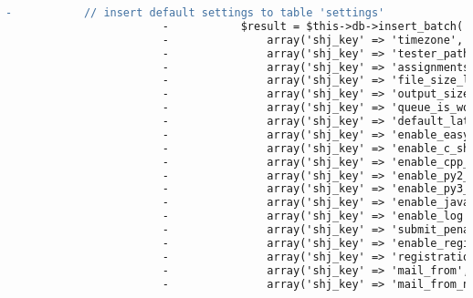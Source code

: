 \begin{lstlisting}[language=diff, caption=Perubahan pada kode Install.php]
						-			// insert default settings to table 'settings'
						-			$result = $this->db->insert_batch('settings', array(
						-				array('shj_key' => 'timezone',               'shj_value' => 'Asia/Jakarta'),
						-				array('shj_key' => 'tester_path',            'shj_value' => dirname(__FILE__, 3) . "/restricted/tester"),
						-				array('shj_key' => 'assignments_root',       'shj_value' => dirname(__FILE__, 3) . "/restricted/assignments"),
						-				array('shj_key' => 'file_size_limit',        'shj_value' => '50'),
						-				array('shj_key' => 'output_size_limit',      'shj_value' => '1024'),
						-				array('shj_key' => 'queue_is_working',       'shj_value' => '0'),
						-				array('shj_key' => 'default_late_rule',      'shj_value' => "/* \n * Put coefficient (from 100) in variable \$coefficient.\n * You can use variables \$extra_time and \$delay.\n * \$extra_time is the total extra time given to users\n * (in seconds) and \$delay is number of seconds passed\n * from finish time (can be negative).\n *  In this example, \$extra_time is 172800 (2 days):\n */\n\nif (\$delay<=0)\n  // no delay\n  \$coefficient = 100;\n\nelseif (\$delay<=3600)\n  // delay less than 1 hour\n  \$coefficient = ceil(100-((30*\$delay)/3600));\n\nelseif (\$delay<=86400)\n  // delay more than 1 hour and less than 1 day\n  \$coefficient = 70;\n\nelseif ((\$delay-86400)<=3600)\n  // delay less than 1 hour in second day\n  \$coefficient = ceil(70-((20*(\$delay-86400))/3600));\n\nelseif ((\$delay-86400)<=86400)\n  // delay more than 1 hour in second day\n  \$coefficient = 50;\n\nelseif (\$delay > \$extra_time)\n  // too late\n  \$coefficient = 0;"),
						-				array('shj_key' => 'enable_easysandbox',     'shj_value' => '1'),
						-				array('shj_key' => 'enable_c_shield',        'shj_value' => '1'),
						-				array('shj_key' => 'enable_cpp_shield',      'shj_value' => '1'),
						-				array('shj_key' => 'enable_py2_shield',      'shj_value' => '1'),
						-				array('shj_key' => 'enable_py3_shield',      'shj_value' => '1'),
						-				array('shj_key' => 'enable_java_policy',     'shj_value' => '1'),
						-				array('shj_key' => 'enable_log',             'shj_value' => '1'),
						-				array('shj_key' => 'submit_penalty',         'shj_value' => '300'),
						-				array('shj_key' => 'enable_registration',    'shj_value' => '0'),
						-				array('shj_key' => 'registration_code',      'shj_value' => '0'),
						-				array('shj_key' => 'mail_from',              'shj_value' => 'no-reply+shj@labftis.net'),
						-				array('shj_key' => 'mail_from_name',         'shj_value' => 'Judge from FTIS Administrator'),

\end{lstlisting}
